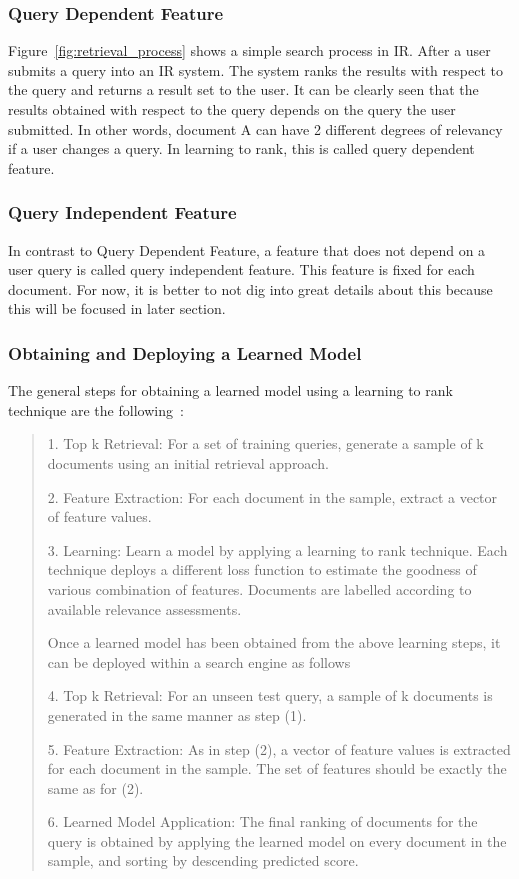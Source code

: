 \subsubsection{Query Dependent Feature}\label{section:querydependent}
Figure~\ref{fig:retrieval_process} shows a simple search process in IR. After a user submits a query into an IR system. The system ranks the results 
with respect to the query and returns a result set to the user. It can be clearly seen that the results obtained with respect to the query depends on the 
query the user submitted. In other words, document A can have 2 different degrees of relevancy if a user changes a query.
In learning to rank, this is called query dependent feature.

\subsubsection{Query Independent Feature}\label{section:queryindependent}
In contrast to Query Dependent Feature, a feature that does not depend on a user query is called query independent feature. This feature is fixed for each
document. For now, it is better to not dig into great details about this because this will be focused in later section.

\subsubsection{Obtaining and Deploying a Learned Model} \label{section:learnedmodel}
The general steps for obtaining a learned model using a learning to rank technique are the following~\cite[P. 4]{learningmodel}:

\begin{quote}
  \item 1. Top k Retrieval: For a set of training queries, generate a sample of k documents using an initial retrieval approach.
  \item 2. Feature Extraction: For each document in the sample, extract a vector of feature values. 
  \item 3. Learning: Learn a model by applying a learning to rank technique. Each technique deploys a different loss function to estimate the goodness of
	various combination of features. Documents are labelled according to available relevance assessments.

Once a learned model has been obtained from the above learning steps, it can be deployed within a search engine as follows~\cite[P. 4]{learningmodel}

 \item 4. Top k Retrieval: For an unseen test query, a sample of k documents is generated in the same manner as step (1).
 \item 5. Feature Extraction: As in step (2), a vector of feature values is extracted for each document in the sample. The set of features should be exactly
	the same as for (2).
 \item 6. Learned Model Application: The final ranking of documents for the query is obtained by applying the learned model on every document in the sample,
	and sorting by descending predicted score.
\end{quote}

